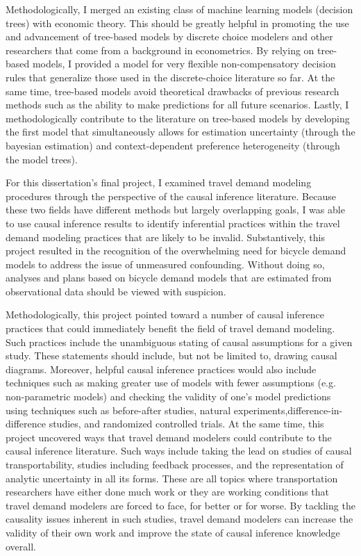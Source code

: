 \documentclass{article}
\begin{document}
Methodologically, I merged an existing class of machine learning models (decision trees) with economic theory. This should be greatly helpful in promoting the use and advancement of tree-based models by discrete choice modelers and other researchers that come from a background in econometrics. By relying on tree-based models, I provided a model for very flexible non-compensatory decision rules that generalize those used in the discrete-choice literature so far. At the same time, tree-based models avoid theoretical drawbacks of previous research methods such as the ability to make predictions for all future scenarios. Lastly, I methodologically contribute to the literature on tree-based models by developing the first model that simultaneously allows for estimation uncertainty (through the bayesian estimation) and context-dependent preference heterogeneity (through the model trees).

For this dissertation's final project, I examined travel demand modeling procedures through the perspective of the causal inference literature. Because these two fields have different methods but largely overlapping goals, I was able to use causal inference results to identify inferential practices within the travel demand modeling practices that are likely to be invalid. Substantively, this project resulted in the recognition of the overwhelming need for bicycle demand models to address the issue of unmeasured confounding. Without doing so, analyses and plans based on bicycle demand models that are estimated from observational data should be viewed with suspicion.

Methodologically, this project pointed toward a number of causal inference practices that could immediately benefit the field of travel demand modeling. Such practices include the unambiguous stating of causal assumptions for a given study. These statements should include, but not be limited to, drawing causal diagrams. Moreover, helpful causal inference practices would also include techniques such as making greater use of models with fewer assumptions (e.g. non-parametric models) and checking the validity of one's model predictions using techniques such as before-after studies, natural experiments,difference-in-difference studies, and randomized controlled trials. At the same time, this project uncovered ways that travel demand modelers could contribute to the causal inference literature. Such ways include taking the lead on studies of causal transportability, studies including feedback processes, and the representation of analytic uncertainty in all its forms. These are all topics where transportation researchers have either done much work or they are working conditions that travel demand modelers are forced to face, for better or for worse. By tackling the causality issues inherent in such studies, travel demand modelers can increase the validity of their own work and improve the state of causal inference knowledge overall.
\end{document}
